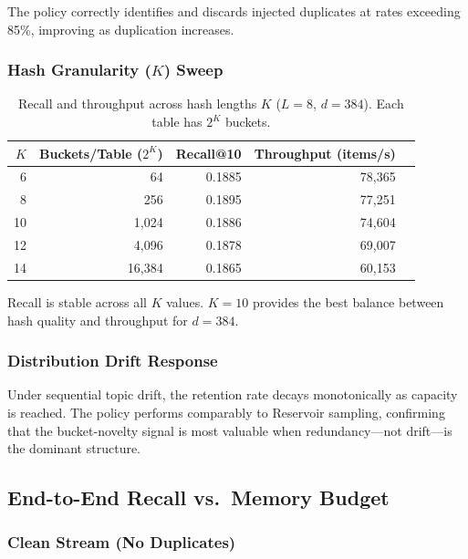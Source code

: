 \documentclass[conference]{IEEEtran}
\begin{document}
The policy correctly identifies and discards injected duplicates at
rates exceeding 85\%, improving as duplication increases.

\subsubsection{Hash Granularity ($K$) Sweep}

\begin{table}[h]
\centering
\caption{Recall and throughput across hash lengths $K$ ($L{=}8$, $d{=}384$).
Each table has $2^K$ buckets.}
\label{tab:k-sweep}
\begin{tabular}{@{}rrrrr@{}}
\toprule
$K$ & Buckets/Table ($2^K$) & Recall@10 & Throughput (items/s) \\
\midrule
 6 &     64 & 0.1885 & 78,365 \\
 8 &    256 & 0.1895 & 77,251 \\
10 &  1,024 & 0.1886 & 74,604 \\
12 &  4,096 & 0.1878 & 69,007 \\
14 & 16,384 & 0.1865 & 60,153 \\
\bottomrule
\end{tabular}
\end{table}

Recall is stable across all $K$ values. $K{=}10$ provides the best
balance between hash quality and throughput for $d{=}384$.

\subsubsection{Distribution Drift Response}
Under sequential topic drift, the retention rate decays monotonically as
capacity is reached. The policy performs comparably to Reservoir
sampling, confirming that the bucket-novelty signal is most valuable
when redundancy---not drift---is the dominant structure.

\subsection{End-to-End Recall vs.\ Memory Budget}

\subsubsection{Clean Stream (No Duplicates)}
\end{document}
